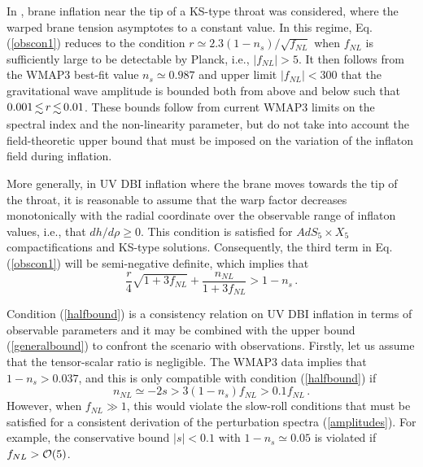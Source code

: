 In \cite{lidser2}, brane inflation near the tip of a KS-type 
throat was considered, where the warped brane tension asymptotes to a 
constant value. In this regime, Eq. (\ref{obscon1}) reduces to 
the condition $r \simeq 2.3 (1-n_s)/\sqrt{f_{NL}}$ when $f_{NL}$ is 
sufficiently large to be detectable by Planck, 
i.e., $|f_{NL}| > 5$. 
It then follows from the  
WMAP3 best-fit value $n_s \simeq 0.987$ and upper limit 
$|f_{NL}| < 300$ \cite{crim} that the gravitational wave amplitude 
is bounded both from above and below such that $0.001 \, \lsim \, r 
\, \lsim \, 0.01$. These bounds follow from 
current WMAP3 limits on the spectral index and the 
non-linearity parameter, but do not take into account the 
field-theoretic upper bound that must be imposed 
on the variation of the inflaton field during inflation. 

More generally, in UV DBI inflation where the brane moves towards the 
tip of the throat, it is reasonable to assume 
that the warp factor decreases monotonically 
with the radial coordinate over the observable range of inflaton values, 
i.e., that $dh/d \rho \ge 0$. This condition is satisfied for  
$AdS_5 \times X_5$ compactifications and KS-type solutions. 
Consequently, the third term in 
Eq. (\ref{obscon1}) will be semi-negative definite, 
which implies that 
\begin{equation}
\label{halfbound}
\frac{r}{4} \sqrt{1+3f_{NL}} + \frac{n_{NL}}{1+3f_{NL}} 
> 1-n_s \,.
\end{equation}

Condition (\ref{halfbound}) is a consistency relation on UV DBI 
inflation in terms of observable parameters and it 
may be combined with the upper bound 
(\ref{generalbound}) to confront the scenario with observations.
Firstly, let us assume that the tensor-scalar ratio is negligible. 
The WMAP3 data implies that $1-n_s > 0.037$, and this is only 
compatible with condition (\ref{halfbound}) if 
\begin{equation}
\label{anotherbound}
n_{NL} \simeq -2s > 3 (1-n_s ) f_{NL} > 0.1 f_{NL} \,.
\end{equation}
However, when $f_{NL} \gg 1$, this would violate the slow-roll conditions
that must be satisfied for a consistent 
derivation of the perturbation spectra 
(\ref{amplitudes}). For example, the conservative 
bound $|s| < 0.1$ with $1-n_s \simeq 0.05$ is violated if  
$f_{NL} > {\cal{O}} (5)$. 

